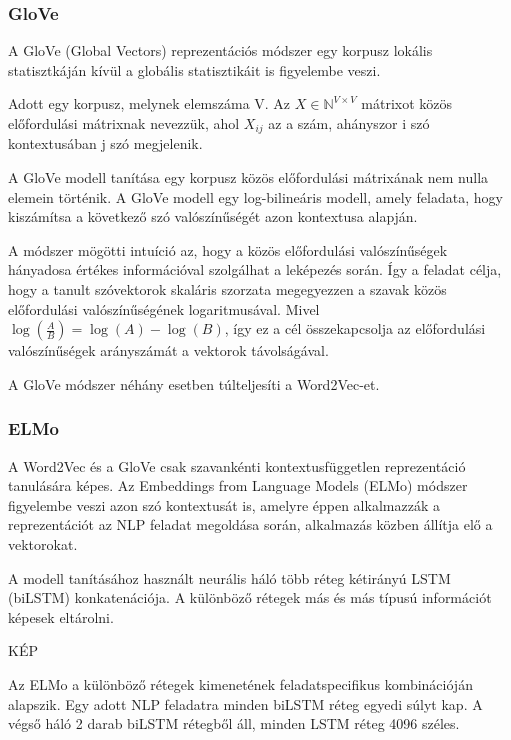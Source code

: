 \subsubsection{GloVe}
A GloVe (Global Vectors) reprezentációs módszer egy korpusz lokális statisztkáján kívül a globális statisztikáit is figyelembe veszi. 

\begin{definition}
	Adott egy korpusz, melynek elemszáma V. Az $X \in \mathbb{N}^{V \times V}$ mátrixot közös előfordulási mátrixnak nevezzük, ahol $X_{ij}$ az a  szám, ahányszor i szó kontextusában j szó megjelenik.  
\end{definition}

A GloVe modell tanítása egy korpusz közös előfordulási mátrixának nem nulla elemein történik. A GloVe modell egy log-bilineáris modell, amely feladata, hogy kiszámítsa a következő szó valószínűségét azon kontextusa alapján.

A módszer mögötti intuíció az, hogy a közös előfordulási valószínűségek hányadosa értékes információval szolgálhat a leképezés során. Így a feladat célja, hogy a tanult szóvektorok skaláris szorzata megegyezzen a szavak közös előfordulási valószínűségének logaritmusával. Mivel $\log \left( \frac{A}{B} \right) = \log \left( A \right) - \log \left( B \right)$, így ez a cél összekapcsolja az előfordulási valószínűségek arányszámát a vektorok távolságával.

\begin{note}
	A GloVe módszer néhány esetben túlteljesíti a Word2Vec-et.
\end{note}

\subsubsection{ELMo}
A Word2Vec és a GloVe csak szavankénti kontextusfüggetlen reprezentáció tanulására képes. Az Embeddings from Language Models (ELMo) módszer figyelembe veszi azon szó kontextusát is, amelyre éppen alkalmazzák a reprezentációt az NLP feladat megoldása során, alkalmazás közben állítja elő a vektorokat.

A modell tanításához használt neurális háló több réteg kétirányú LSTM (biLSTM) konkatenációja. A különböző rétegek más és más típusú információt képesek eltárolni.

KÉP

Az ELMo a különböző rétegek kimenetének feladatspecifikus kombinációján alapszik. Egy adott NLP feladatra minden biLSTM réteg egyedi súlyt kap. A végső háló 2 darab biLSTM rétegből áll, minden LSTM réteg 4096 széles.


